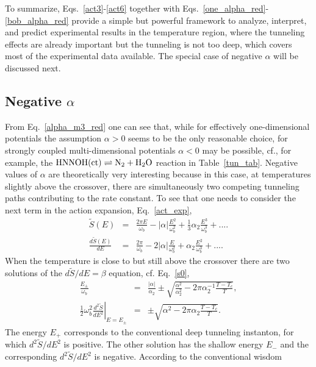 \documentclass[journal=jpcafh,manuscript=article]{achemso}
\begin{document}
To summarize, Eqs.~\ref{act3}-\ref{act6} together with
Eqs.~\ref{one_alpha_red}-\ref{bob_alpha_red} provide a simple but
powerful framework to analyze, interpret, and predict experimental
results in the temperature region, where the tunneling effects are
already important but the tunneling is not too deep, which covers most
of the experimental data available. The special case of negative
$\alpha$ will be discussed next.

\subsection{Negative $\alpha$}

From Eq.~\ref{alpha_m3_red} one can see that, while for effectively
one-dimensional potentials the assumption $\alpha>0$ seems to be the
only reasonable choice, for strongly coupled multi-dimensional
potentials $\alpha < 0$ may be possible, cf., for example, the
$\rm HNNOH(ct)\rightleftharpoons N_2+H_2O$ reaction in Table~\ref{tun_tab}.
Negative values of $\alpha$ are theoretically very interesting because
in this case, at temperatures slightly above the crossover, there are
simultaneously two competing tunneling paths contributing to the rate
constant. To see that one needs to consider the next term in the
action expansion, Eq.~\ref{act_exp},
\begin{eqnarray}
  \label{act_exp_3a}
  \tilde{S}(E)&=&\frac{2\pi{E}}{\omega_b}-|\alpha|\frac{E^2}{\omega_b^2}
  +\frac{1}{3}\alpha_2\frac{E^3}{\omega_b^3}+... .
  \\
  \label{act_exp_3b}
  \frac{d\tilde{S}(E)}{dE}&=&\frac{2\pi}{\omega_b}-2|\alpha|\frac{E}{\omega_b^2}+\alpha_2\frac{E^2}{\omega_b^3}+... .  
\end{eqnarray}
When the temperature is close to but still above the crossover there
are two solutions of the $d\tilde{S}/dE=\beta$ equation,
cf. Eq.~\ref{s0},
\begin{eqnarray}
  \label{ins_en_a}
  \frac{E_{\pm}}{\omega_b}&=&\frac{|\alpha|}{\alpha_2}\pm\sqrt{\frac{\alpha^2}{\alpha_2^2}-2\pi\alpha_2^{-1}\frac{T-T_c}{T}},
  \\
  \label{ins_en_b}
\frac{1}{2}\omega_b^2\left.\frac{d^2\tilde{S}}{dE^2}\right|_{E=E_\pm}&=&\pm\sqrt{\alpha^2-2\pi\alpha_2\frac{T-T_c}{T}}.
\end{eqnarray}
The energy $E_+$ corresponds to the conventional deep tunneling
instanton, for which $d^2\tilde{S}/dE^2$ is positive. The other
solution has the shallow energy $E_-$ and the corresponding
$d^2\tilde{S}/dE^2$ is negative.  According to the conventional wisdom
\end{document}
